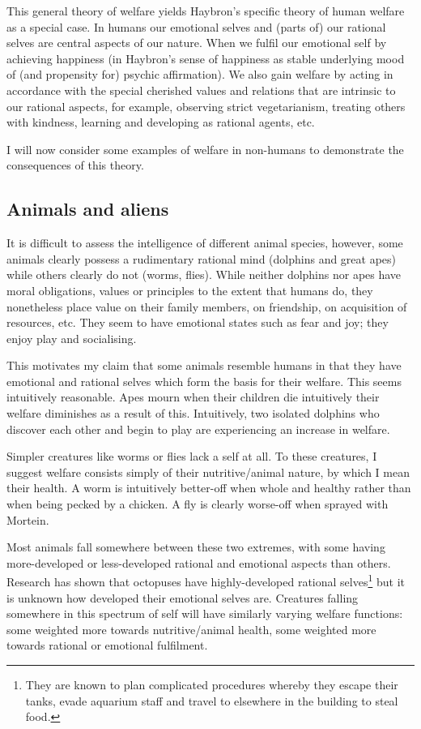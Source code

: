 \documentclass{article}
\begin{document}
This general theory of welfare yields Haybron's specific theory of human welfare as a special case. In humans our emotional selves and (parts of) our rational selves are central aspects of our nature. When we fulfil our emotional self by achieving happiness (in Haybron's sense of happiness as stable underlying mood of (and propensity for) psychic affirmation). We also gain welfare by acting in accordance with the special cherished values and relations that are intrinsic to our rational aspects, for example, observing strict vegetarianism, treating others with kindness, learning and developing as rational agents, etc.

I will now consider some examples of welfare in non-humans to demonstrate the consequences of this theory.

\subsection{Animals and aliens}

It is difficult to assess the intelligence of different animal species, however, some animals clearly possess a rudimentary rational mind (dolphins and great apes) while others clearly do not (worms, flies). While neither dolphins nor apes have moral obligations, values or principles to the extent that humans do, they nonetheless place value on their family members, on friendship, on acquisition of resources, etc. They seem to have emotional states such as fear and joy; they enjoy play and socialising. 

This motivates my claim that some animals resemble humans in that they have emotional and rational selves which form the basis for their welfare. This seems intuitively reasonable. Apes mourn when their children die \textemdash{} intuitively their welfare diminishes as a result of this. Intuitively, two isolated dolphins who discover each other and begin to play are experiencing an increase in welfare. 

Simpler creatures like worms or flies lack a self at all. To these creatures, I suggest welfare consists simply of their nutritive/animal nature, by which I mean their health. A worm is intuitively better-off when whole and healthy rather than when being pecked by a chicken. A fly is clearly worse-off when sprayed with Mortein. 

Most animals fall somewhere between these two extremes, with some having more-developed or less-developed rational and emotional aspects than others. Research has shown that octopuses have highly-developed rational selves\footnote{They are known to plan complicated procedures whereby they escape their tanks, evade aquarium staff and travel to elsewhere in the building to steal food.} but it is unknown how developed their emotional selves are. Creatures falling somewhere in this spectrum of self will have similarly varying welfare functions: some weighted more towards nutritive/animal health, some weighted more towards rational or emotional fulfilment.
\end{document}
